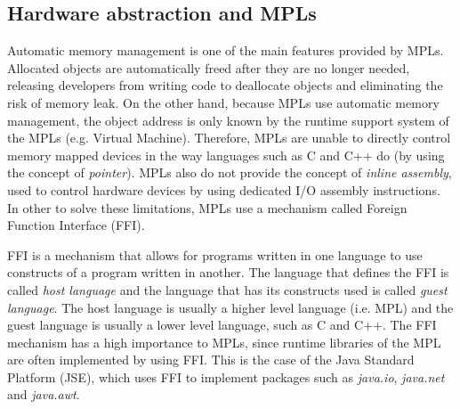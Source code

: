 

\subsection{Hardware abstraction and MPLs}
Automatic memory management is one of the main features provided by MPLs.
Allocated objects are automatically freed after they are no longer needed,
releasing developers from writing code to deallocate objects and eliminating the
risk of memory leak.
On the other hand, because MPLs use automatic memory management, the object
address is only known by the runtime support system of the MPLs (e.g. Virtual Machine).
Therefore, MPLs are unable to directly control memory mapped devices in the
way languages such as C and C++ do (by using the concept of \emph{pointer}).
MPLs also do not provide the concept of \emph{inline assembly}, used to
control hardware devices by using dedicated I/O assembly instructions.
In other to solve these limitations, MPLs use a mechanism called Foreign
Function Interface (FFI).

FFI is a mechanism that allows for programs written in one language to use
constructs of a program written in another.
The language that defines the FFI is called \emph{host language} and the
language that has its constructs used is called \emph{guest language}.
The host language is usually a higher level language (i.e. MPL) and the guest
language is usually a lower level language, such as C and C++.
% 
The FFI mechanism has a high importance to MPLs, since runtime libraries of the
MPL are often implemented by using FFI.
This is the case of the Java Standard Platform (JSE), which uses FFI to
implement packages such as \emph{java.io}, \emph{java.net} and \emph{java.awt}.
% 

